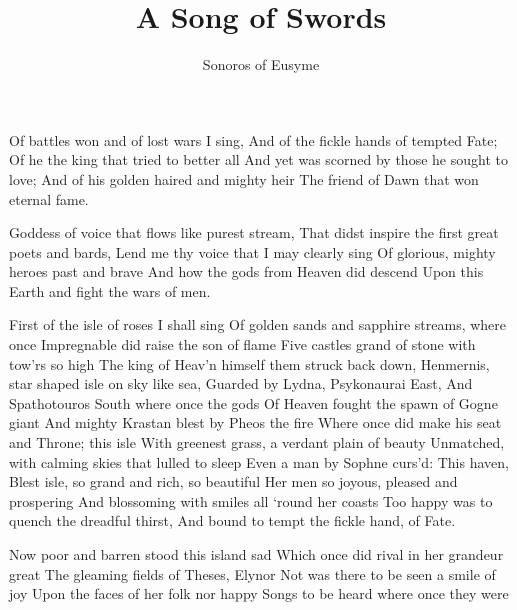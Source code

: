 \documentclass[a4paper,12pt]{article}
\title{A Song of Swords}
\author{Sonoros of Eusyme}
\date{}
\newcommand{\vel}{\verseline}
\begin{document}
\maketitle

\begin{poem}
\verselinenumbersgutter
\centertitlesscheme
{}
\verselinenumberstoleft
\setlength{\marginparsep}{-20pt}
\bigskip
\begin{stanza}
Of battles won and of lost wars I sing,\verseline
And of the fickle hands of tempted Fate;\verseline
Of he the king that tried to better all \vel
And yet was scorned by those he sought to love;\verseline
And of his golden haired and mighty heir\verseline
The friend of Dawn that won eternal fame.
\end{stanza}
\begin{stanza}
Goddess of voice that flows like purest stream,\verseline
That didst inspire the first great poets and bards,\verseline
Lend me thy voice that I may clearly sing\verseline
Of glorious, mighty heroes past and brave\verseline
And how the gods from Heaven did descend\verseline
Upon this Earth and fight the wars of men.
\end{stanza}
\begin{stanza}
First of the isle of roses I shall sing\vel
Of golden sands and sapphire streams, where once\vel
Impregnable did raise the son of flame\vel
Five castles grand of stone with tow’rs so high\vel
The king of Heav’n himself them struck back down,\vel
Henmernis, star shaped isle on sky like sea,\vel
Guarded by Lydna, Psykonaurai East,\vel
And Spathotouros South where once the gods\vel
Of Heaven fought the spawn of Gogne giant\vel
And mighty Krastan blest by Pheos the fire\vel
Where once did make his seat and Throne; this isle\vel
With greenest grass, a verdant plain of beauty\vel
Unmatched, with calming skies that lulled to sleep\vel
Even a man by Sophne curs'd: This haven,\vel
Blest isle, so grand and rich, so beautiful\vel
Her men so joyous, pleased and prospering\vel
And blossoming with smiles all ‘round her coasts\vel
Too happy was to quench the dreadful thirst,\vel
And bound to tempt the fickle hand, of Fate.
\end{stanza}
\begin{stanza}
Now poor and barren stood this island sad\vel
Which once did rival in her grandeur great\vel
The gleaming fields of Theses, Elynor\vel
Not was there to be seen a smile of joy\vel
Upon the faces of her folk nor happy\vel
Songs to be heard where once they were\vel

\end{stanza}
\end{poem}
\end{document}
